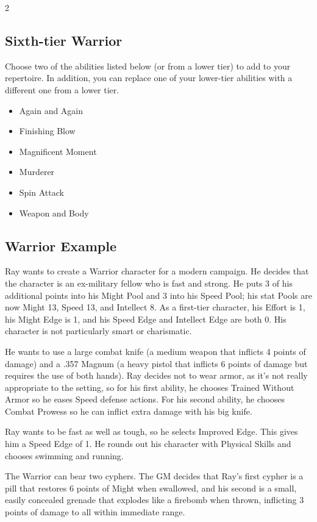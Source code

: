 \begin{multicols}{2}
\subsection{Sixth-tier Warrior}

Choose two of the abilities listed below (or from a lower tier) to add to your repertoire. In addition, you can replace one of your lower-tier abilities with a different one from a lower tier.

\begin{itemize}
\item Again and Again
\item Finishing Blow
\item Magnificent Moment
\item Murderer
\item Spin Attack
\item Weapon and Body
\end{itemize}

\subsection{Warrior Example}

Ray wants to create a Warrior character for a modern campaign. He decides that the character is an ex-military fellow who is fast and strong. He puts 3 of his additional points into his Might Pool and 3 into his Speed Pool; his stat Pools are now Might 13, Speed 13, and Intellect 8. As a first-tier character, his Effort is 1, his Might Edge is 1, and his Speed Edge and Intellect Edge are both 0. His character is not particularly smart or charismatic.

He wants to use a large combat knife (a medium weapon that inflicts 4 points of damage) and a .357 Magnum (a heavy pistol that inflicts 6 points of damage but requires the use of both hands). Ray decides not to wear armor, as it’s not really appropriate to the setting, so for his first ability, he chooses Trained Without Armor so he eases Speed defense actions. For his second ability, he chooses Combat Prowess so he can inflict extra damage with his big knife. 

Ray wants to be fast as well as tough, so he selects Improved Edge. This gives him a Speed Edge of 1. He rounds out his character with Physical Skills and chooses swimming and running.

The Warrior can bear two cyphers. The GM decides that Ray’s first cypher is a pill that restores 6 points of Might when swallowed, and his second is a small, easily concealed grenade that explodes like a firebomb when thrown, inflicting 3 points of damage to all within immediate range. 


\end{multicols}
